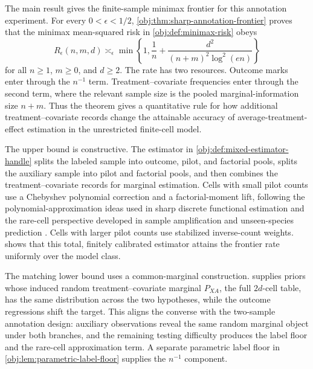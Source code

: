 \documentclass[11pt]{article}
\begin{document}
The main result gives the finite-sample minimax frontier for this annotation experiment. For every \(0<\epsilon<1/2\), \cref{obj:thm:sharp-annotation-frontier} proves that the minimax mean-squared risk in \cref{obj:def:minimax-risk} obeys
\[
R_\epsilon(n,m,d)\asymp_\epsilon
\min\left\{1,\frac1n+\frac{d^2}{(n+m)^2\log^2(en)}\right\}
\]
for all \(n\ge1\), \(m\ge0\), and \(d\ge2\). The rate has two resources. Outcome marks enter through the \(n^{-1}\) term. Treatment--covariate frequencies enter through the second term, where the relevant sample size is the pooled marginal-information size \(n+m\). Thus the theorem gives a quantitative rule for how additional treatment--covariate records change the attainable accuracy of average-treatment-effect estimation in the unrestricted finite-cell model.

The upper bound is constructive. The estimator in \cref{obj:def:mixed-estimator-handle} splits the labeled sample into outcome, pilot, and factorial pools, splits the auxiliary sample into pilot and factorial pools, and then combines the treatment--covariate records for marginal estimation. Cells with small pilot counts use a Chebyshev polynomial correction and a factorial-moment lift, following the polynomial-approximation ideas used in sharp discrete functional estimation \citep{JiaoVenkatHanWeissman2015,WuYang2016} and the rare-cell perspective developed in sample amplification and unseen-species prediction \citep{ValiantValiant2017,OrlitskySureshWu2016}. Cells with larger pilot counts use stabilized inverse-count weights.  shows that this total, finitely calibrated estimator attains the frontier rate uniformly over the model class.

The matching lower bound uses a common-marginal construction.  supplies priors whose induced random treatment--covariate marginal \(P_{XA}\), the full \(2d\)-cell table, has the same distribution across the two hypotheses, while the outcome regressions shift the target. This aligns the converse with the two-sample annotation design: auxiliary observations reveal the same random marginal object under both branches, and the remaining testing difficulty produces the label floor and the rare-cell approximation term. A separate parametric label floor in \cref{obj:lem:parametric-label-floor} supplies the \(n^{-1}\) component.
\end{document}
